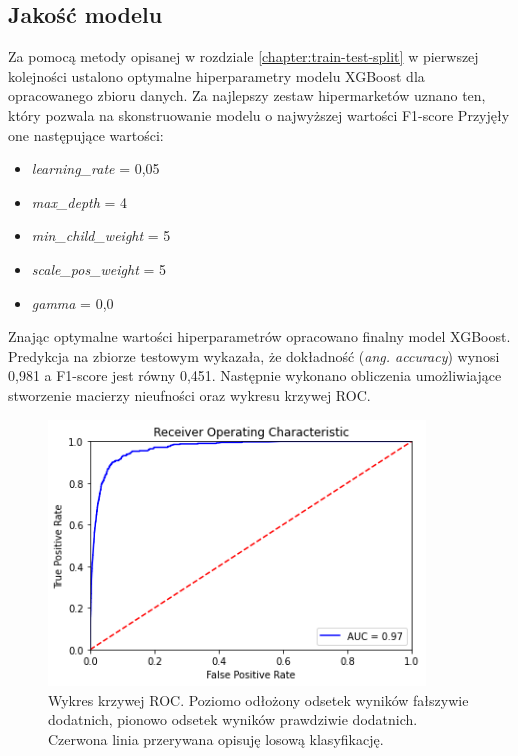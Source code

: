 \documentclass[polish, twoside, 12pt, a4paper]{article}
\theoremstyle{definition}
\theoremstyle{plain}
\theoremstyle{remark}
\begin{document}
\subsection{Jakość modelu}

Za pomocą metody opisanej w rozdziale \ref{chapter:train-test-split} w pierwszej kolejności ustalono optymalne hiperparametry modelu XGBoost dla opracowanego zbioru danych. Za najlepszy zestaw hipermarketów uznano ten, który pozwala na skonstruowanie modelu o najwyższej wartości F1-score Przyjęły one następujące wartości:
\begin{itemize}
 \item \emph{learning\_rate} = 0,05
 \item \emph{max\_depth} = 4
 \item \emph{min\_child\_weight} = 5
 \item \emph{scale\_pos\_weight} = 5
 \item \emph{gamma} = 0,0
\end{itemize}

Znając optymalne wartości hiperparametrów opracowano finalny model XGBoost. Predykcja na zbiorze testowym wykazała, że dokładność (\emph{ang. accuracy}) wynosi 0,981 a F1-score jest równy 0,451. Następnie wykonano obliczenia umożliwiające stworzenie macierzy nieufności oraz wykresu krzywej ROC.

\begin{figure}[H]
\centering
\includegraphics[width=10cm]{roc.png}
\caption{Wykres krzywej ROC. Poziomo odłożony odsetek wyników fałszywie dodatnich, pionowo odsetek wyników prawdziwie dodatnich. Czerwona linia przerywana opisuję losową klasyfikację. }
\end{figure}
\end{document}
